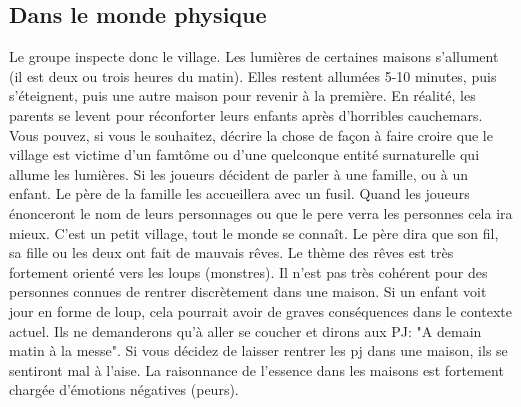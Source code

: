 \documentclass[oneside,12pt]{book}
\begin{document}
\begin{flushleft}
\subsection{Dans le monde physique}
\label{physique_enquete}
Le groupe inspecte donc le village. 
Les lumières de certaines maisons s'allument (il est deux ou trois heures du matin).
Elles restent allumées 5-10 minutes, puis s’éteignent, puis une autre maison pour revenir à la première. 
En réalité, les parents se levent pour réconforter leurs enfants après d'horribles cauchemars. 
Vous pouvez, si vous le souhaitez, décrire la chose de façon à faire croire que le village est 
victime d'un famtôme ou d'une quelconque entité surnaturelle qui allume les lumières.
Si les joueurs décident de parler à une famille, ou à un enfant. 
Le père de la famille les accueillera avec un fusil. Quand les joueurs énonceront le nom de leurs personnages ou que le pere verra les personnes cela ira mieux.
C'est un petit village, tout le monde se connaît.
Le père dira que son fil, sa fille ou les deux ont fait de mauvais rêves. 
Le thème des rêves est très fortement orienté vers les loups (monstres). 
Il n'est pas très cohérent pour des personnes connues de rentrer discrètement dans une maison. Si un enfant voit jour en forme de loup, cela pourrait avoir de graves conséquences dans le contexte actuel.
Ils ne demanderons qu'à aller se coucher et dirons aux PJ: "A demain matin à la messe".
Si vous décidez de laisser rentrer les pj dans une maison, ils se sentiront mal à l'aise. La raisonnance de l'essence dans les maisons est fortement chargée d'émotions négatives (peurs).


\end{flushleft}
\end{document}
